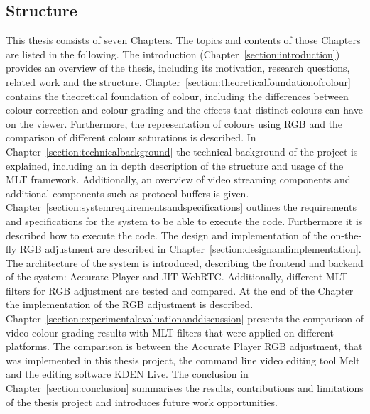 \documentclass[../MasterThesis.tex]{subfiles}
\begin{document}
	\subsection{Structure} \label{subsection:structure}
	
	This thesis consists of seven Chapters. The topics and contents of those Chapters are listed in the following.
	The introduction (Chapter~\ref{section:introduction}) provides an overview of the thesis, including its motivation, research questions, related work and the structure.
	Chapter~\ref{section:theoreticalfoundationofcolour} contains the theoretical foundation of colour, including the differences between colour correction and colour grading and the effects that distinct colours can have on the viewer. Furthermore, the representation of colours using RGB and the comparison of different colour saturations is described.
	In Chapter~\ref{section:technicalbackground} the technical background of the project is explained, including an in depth description of the structure and usage of the MLT framework. Additionally, an overview of video streaming components and additional components such as protocol buffers is given.
	Chapter~\ref{section:systemrequirementsandspecifications} outlines the requirements and specifications for the system to be able to execute the code. Furthermore it is described how to execute the code.
	The design and implementation of the on-the-fly RGB adjustment are described in Chapter~\ref{section:designandimplementation}. The architecture of the system is introduced, describing the frontend and backend of the system: Accurate Player and JIT-WebRTC. Additionally, different MLT filters for RGB adjustment are tested and compared. At the end of the Chapter the implementation of the RGB adjustment is described.
	Chapter~\ref{section:experimentalevaluationanddiscussion} presents the comparison of video colour grading results with MLT filters that were applied on different platforms. The comparison is between the Accurate Player RGB adjustment, that was implemented in this thesis project, the command line video editing tool Melt and the editing software KDEN Live.
	The conclusion in Chapter~\ref{section:conclusion} summarises the results, contributions and limitations of the thesis project and introduces future work opportunities.
		

	
	
	
	

	
	

	
	
	
\end{document}
